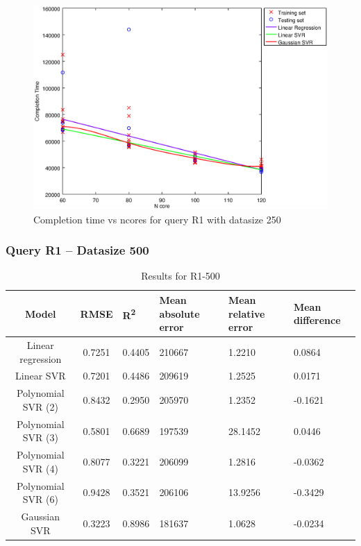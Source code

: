 \documentclass[a4paper,11pt]{article}
\begin{document}
\begin {figure}[hbtp]
\centering
\includegraphics[width=\textwidth]{output/R1_250_ONLY_1_LINEAR_NCORE/plot_R1_250_bestmodels.eps}
\caption{Completion time vs ncores for query R1 with datasize 250}
\label{fig:coreonly_linear_R1_250}
\end {figure}

\newpage
\subsubsection{Query R1 -- Datasize 500}
\begin{table}[H]
	\centering
	\begin{adjustbox}{center}
		\begin{tabular}{c | c M{1.2cm} M{2.5cm} M{2.5cm} M{1.8cm}}
			Model & RMSE & R\textsuperscript{2} & Mean absolute error & Mean relative error & Mean difference \tabularnewline
			\hline
			Linear regression & 0.7251 & 0.4405 & 210667 & 1.2210 & 0.0864 \\
			Linear SVR & 0.7201 & 0.4486 & 209619 & 1.2525 & 0.0171 \\
			Polynomial SVR (2) & 0.8432 & 0.2950 & 205970 & 1.2352 & -0.1621 \\
			Polynomial SVR (3) & 0.5801 & 0.6689 & 197539 & 28.1452 & 0.0446 \\
			Polynomial SVR (4) & 0.8077 & 0.3221 & 206099 & 1.2816 & -0.0362 \\
			Polynomial SVR (6) & 0.9428 & 0.3521 & 206106 & 13.9256 & -0.3429 \\
			Gaussian SVR & 0.3223 & 0.8986 & 181637 & 1.0628 & -0.0234 \\
		\end{tabular}
	\end{adjustbox}
	\\
	\caption{Results for R1-500}
	\label{fig:coreonly_linear_R1_500}
\end{table}
\end{document}
